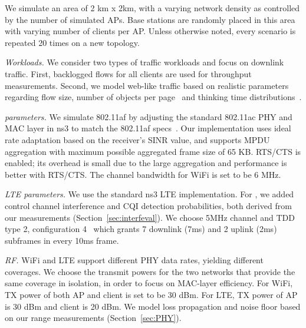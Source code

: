 We simulate an area of 2 km x 2km, with a varying network density as controlled by the number of simulated APs. 
Base stations are randomly placed in this area with varying number of clients per AP. 
Unless otherwise noted, every scenario is repeated 20 times on a new topology. 

{\em Workloads.} We consider two types of traffic workloads and focus on downlink traffic. 
First, backlogged flows for all clients are used for throughput measurements. Second, 
we model web-like traffic based on realistic parameters regarding flow size, 
number of objects per page~\cite{trafficmodel} and thinking time distributions~\cite{thinktime}. 



{\em \wf parameters.} We simulate 802.11af by adjusting the standard 802.11ac PHY and MAC layer in ns3 to match the 802.11af specs~\cite{Rice_af}. 
Our \wf implementation uses ideal rate adaptation based on the 
receiver's SINR value, and supports MPDU aggregation with maximum possible aggregated frame size of 65 KB. 
RTS/CTS is enabled; its overhead is small due to the large aggregation and \wf performance is better with RTS/CTS.
The channel bandwidth for WiFi is set to be 6 MHz.

{\em LTE parameters.} We use the standard ns3 LTE implementation. For \cf, we added 
control channel interference and CQI detection probabilities, both derived from our measurements (Section~\ref{sec:interfeval}).
We choose 5MHz channel and TDD type 2, configuration 4~\cite{36_211} which grants 7 downlink (7ms) and 2 uplink (2ms) subframes in every 10ms frame.


{\em RF.} WiFi and LTE support different PHY data rates, yielding different coverages. 
We choose the transmit powers for the two networks that provide the same coverage in isolation, 
in order to focus on MAC-layer efficiency.
For WiFi, TX power of both AP and client is set to be 30 dBm. For LTE, TX power of AP is 30 dBm and client is 20 dBm. 
We model loss propagation and noise floor based on our range measurements (Section~\ref{sec:PHY}).



